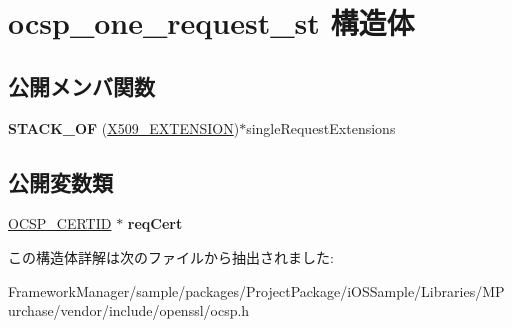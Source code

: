 \hypertarget{structocsp__one__request__st}{}\section{ocsp\+\_\+one\+\_\+request\+\_\+st 構造体}
\label{structocsp__one__request__st}
\subsection*{公開メンバ関数}
\begin{DoxyCompactItemize}
\item 
\hypertarget{structocsp__one__request__st_afa4e9dd8e32ad379ef5f91c24ffd3e25}{}{\bfseries S\+T\+A\+C\+K\+\_\+\+O\+F} (\hyperlink{struct_x509__extension__st}{X509\+\_\+\+E\+X\+T\+E\+N\+S\+I\+O\+N})$\ast$single\+Request\+Extensions\label{structocsp__one__request__st_afa4e9dd8e32ad379ef5f91c24ffd3e25}

\end{DoxyCompactItemize}
\subsection*{公開変数類}
\begin{DoxyCompactItemize}
\item 
\hypertarget{structocsp__one__request__st_acb10504260c2974865557a3d04ff0fa5}{}\hyperlink{structocsp__cert__id__st}{O\+C\+S\+P\+\_\+\+C\+E\+R\+T\+I\+D} $\ast$ {\bfseries req\+Cert}\label{structocsp__one__request__st_acb10504260c2974865557a3d04ff0fa5}

\end{DoxyCompactItemize}


この構造体詳解は次のファイルから抽出されました\+:\begin{DoxyCompactItemize}
\item 
Framework\+Manager/sample/packages/\+Project\+Package/i\+O\+S\+Sample/\+Libraries/\+M\+Purchase/vendor/include/openssl/ocsp.\+h\end{DoxyCompactItemize}
